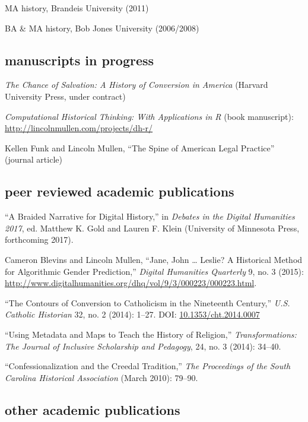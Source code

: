 \documentclass[11pt]{article}
\begin{document}
MA history, Brandeis University (2011)

BA \& MA history, Bob Jones University (2006/2008)

\subsection{manuscripts in 
  progress}\label{manuscripts-and-other-projects-in-progress}

\emph{The Chance of Salvation: A History of Conversion in America} (Harvard 
University Press, under contract)

\emph{Computational Historical Thinking: With Applications in R} (book 
manuscript): \url{http://lincolnmullen.com/projects/dh-r/}

Kellen Funk and Lincoln Mullen, ``The Spine of American Legal Practice'' 
(journal article)

\subsection{peer reviewed academic publications}\label{peer-reviewed}

``A Braided Narrative for Digital History,'' in \emph{Debates in the Digital 
  Humanities 2017}, ed. Matthew K. Gold and Lauren F. Klein (University of 
Minnesota Press, forthcoming 2017).

Cameron Blevins and Lincoln Mullen, ``Jane, John \ldots{} Leslie? A
Historical Method for Algorithmic Gender Prediction,'' \emph{Digital
  Humanities Quarterly} 9, no. 3 (2015): 
\url{http://www.digitalhumanities.org/dhq/vol/9/3/000223/000223.html}.

``The Contours of Conversion to Catholicism in the Nineteenth Century,''
\emph{U.S. Catholic Historian} 32, no. 2 (2014): 1--27. DOI:
\href{http://dx.doi.org/10.1353/cht.2014.0007}{10.1353/cht.2014.0007}

``Using Metadata and Maps to Teach the History of Religion,''
\emph{Transformations: The Journal of Inclusive Scholarship and
  Pedagogy}, 24, no. 3 (2014): 34--40.

``Confessionalization and the Creedal Tradition,'' \emph{The Proceedings
  of the South Carolina Historical Association} (March 2010): 79--90.

\subsection{other academic publications}\label{other-academic}
\end{document}
